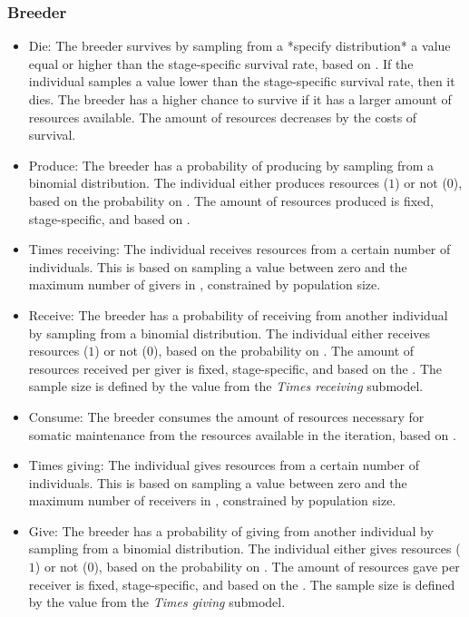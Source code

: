 \documentclass{article}
\begin{document}
\subsubsection{Breeder}

\begin{itemize}
    \item Die: The breeder survives by sampling from a *specify distribution* a value equal or higher than the stage-specific survival rate, based on \cite{gurven2007longevity}. If the individual samples a value lower than the stage-specific survival rate, then it dies. The breeder has a higher chance to survive if it has a larger amount of resources available. The amount of resources decreases by the costs of survival.
    \item Produce: The breeder has a probability of producing by sampling from a binomial distribution. The individual either produces resources ($1$) or not ($0$), based on the probability on \cite{koster2020life}. The amount of resources produced is fixed, stage-specific, and based on \cite{koster2020life}.
    \item Times receiving: The individual receives resources from a certain number of individuals. This is based on sampling a value between zero and the maximum number of givers in \cite{gurven2004give}, constrained by population size.
    \item Receive: The breeder has a probability of receiving from another individual by sampling from a binomial distribution. The individual either receives resources ($1$) or not ($0$), based on the probability on \cite{gurven2004give}. The amount of resources received per giver is fixed, stage-specific, and based on the \cite{gurven2004give}. The sample size is defined by the value from the \emph{Times receiving} submodel. 
    \item Consume: The breeder consumes the amount of resources necessary for somatic maintenance from the resources available in the iteration, based on \cite{kaplan2000theory}.
    \item Times giving: The individual gives resources from a certain number of individuals. This is based on sampling a value between zero and the maximum number of receivers in \cite{gurven2004give}, constrained by population size.
    \item Give: The breeder has a probability of giving from another individual by sampling from a binomial distribution. The individual either gives resources ($1$) or not ($0$), based on the probability on \cite{gurven2004give}. The amount of resources gave per receiver is fixed, stage-specific, and based on the \cite{gurven2004give}. The sample size is defined by the value from the \emph{Times giving} submodel. 

\end{itemize}
\end{document}
